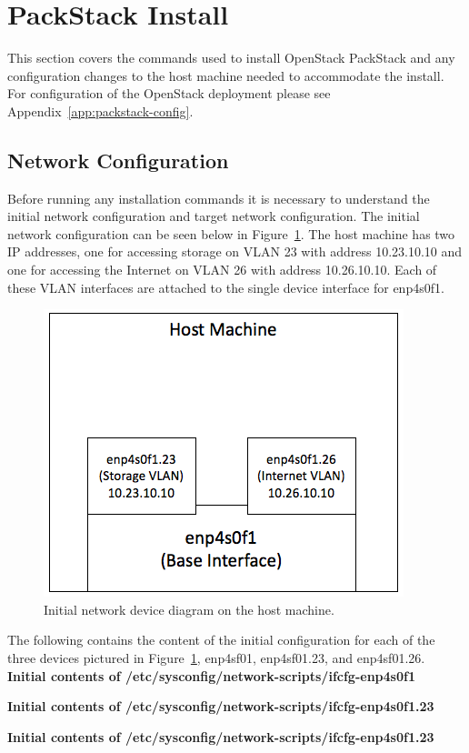 \section{PackStack Install}
\label{app:packstack-install}

This section covers the commands used to install OpenStack PackStack and 
any configuration changes to the host machine needed to accommodate the
install. For configuration of the OpenStack deployment please see
Appendix~\ref{app:packstack-config}.

\subsection{Network Configuration}
\label{host-network-config}
Before running any installation commands it is necessary to understand
the initial network configuration and target network configuration. The
initial network configuration can be seen below in
Figure~\ref{fig:initial-network}. The host machine has two IP addresses,
one for accessing storage on VLAN 23 with address 10.23.10.10 and one
for accessing the Internet on VLAN 26 with address 10.26.10.10. Each of
these VLAN interfaces are attached to the single device interface for
enp4s0f1.

\begin{figure}[H]
  \centering
  \includegraphics[scale=0.5]{img/initial-network}
  \caption{Initial network device diagram on the host machine.}
  \label{fig:initial-network}
\end{figure}

The following contains the content of the initial configuration for each
of the three devices pictured in Figure~\ref{fig:initial-network},
enp4sf01, enp4sf01.23, and enp4sf01.26.\\
\textbf{Initial contents of /etc/sysconfig/network-scripts/ifcfg-enp4s0f1}

\textbf{Initial contents of /etc/sysconfig/network-scripts/ifcfg-enp4s0f1.23}

\textbf{Initial contents of /etc/sysconfig/network-scripts/ifcfg-enp4s0f1.23}


